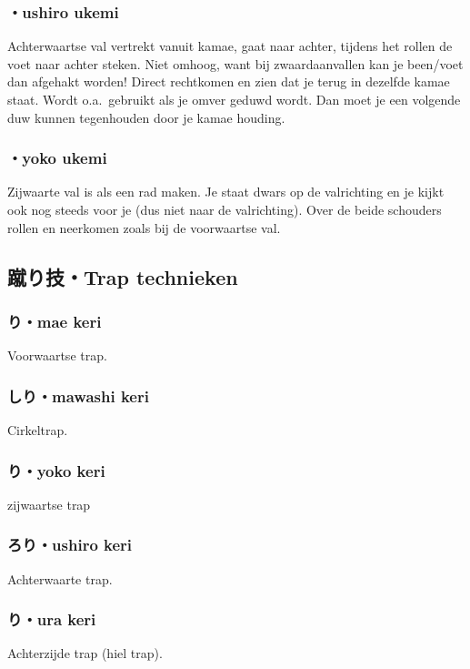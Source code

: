 \subsubsection{・ushiro ukemi}
Achterwaartse val vertrekt vanuit kamae, gaat naar achter, tijdens het rollen de voet naar achter steken. Niet omhoog, want bij zwaardaanvallen kan je been/voet dan afgehakt worden! Direct rechtkomen en zien dat je terug in dezelfde kamae staat. Wordt o.a.\ gebruikt als je omver geduwd wordt. Dan moet je een volgende duw kunnen tegenhouden door je kamae houding.

\subsubsection{・yoko ukemi}
Zijwaarte val is als een rad maken. Je staat dwars op de valrichting en je kijkt ook nog steeds voor je (dus niet naar de valrichting). Over de beide schouders rollen en neerkomen zoals bij de voorwaartse val.

\subsection{蹴り技・Trap technieken}
\subsubsection{り・mae keri}
Voorwaartse trap.

\subsubsection{しり・mawashi keri}
Cirkeltrap.

\subsubsection{り・yoko keri} 
zijwaartse trap

\subsubsection{ろり・ushiro keri}
Achterwaarte trap.   

\subsubsection{り・ura keri}
Achterzijde trap (hiel trap).

